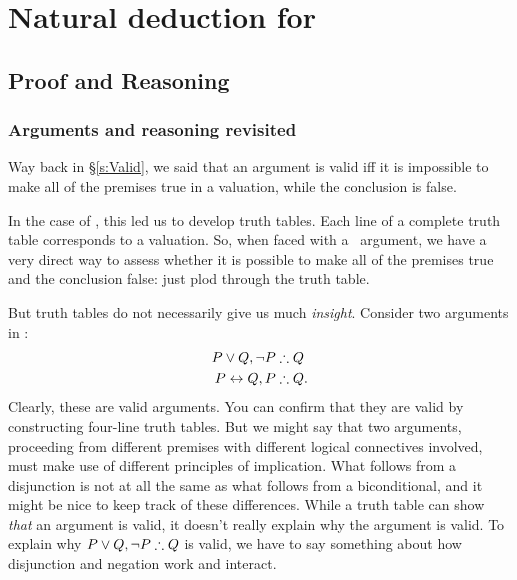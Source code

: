 

\part{Natural deduction for {\TFL}}
\label{ch.NDTFL}

\chapter{Proof and Reasoning}\label{s:NDVeryIdea}

\section{Arguments and reasoning revisited} %
\label{sec:arguments_and_reasoning_revisited}


Way back in §\ref{s:Valid}, we said that an argument is valid iff it is impossible to make all of the premises true in a valuation, while the conclusion is false. 

In the case of \TFL, this led us to develop truth tables. Each line of a complete truth table corresponds to a valuation. So, when faced with a \TFL\ argument, we have a very direct way to assess whether it is possible to make all of the premises true and the conclusion false: just plod through the truth table.

But truth tables do not necessarily give us much \emph{insight}. Consider two arguments in \TFL:
	\begin{align*}
		P \vee Q, \neg P & \mathrel{\therefore} Q\\
		P \leftrightarrow Q, P & \mathrel{\therefore} Q.
	\end{align*}
Clearly, these are valid arguments. You can confirm that they are valid by constructing four-line truth tables. But we might say that two arguments, proceeding from different premises with different logical connectives involved, must make use of different principles of implication. What follows from a disjunction is not at all the same as what follows from a biconditional, and it might be nice to keep track of these differences. While a truth table can show \emph{that} an argument is valid, it doesn't really explain why the argument is valid. To explain why $P \vee Q, \neg P \mathrel{\therefore} Q$ is valid, we have to say something about how disjunction and negation work and interact.

